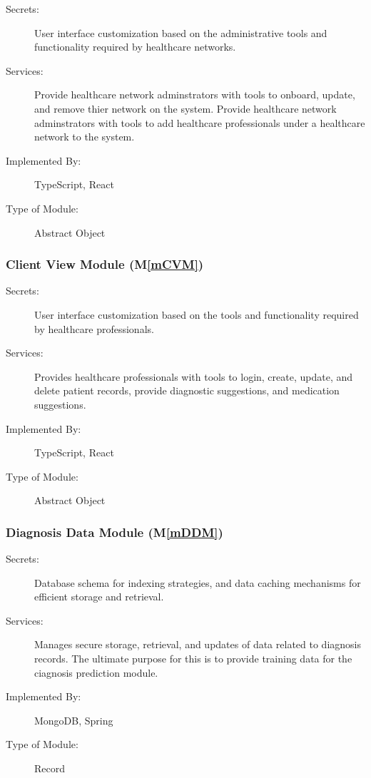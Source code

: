 \documentclass[12pt, titlepage]{article}
\newcommand{\mref}[1]{M\ref{#1}}
\begin{document}
\begin{description}
\item[Secrets:]User interface customization based on the administrative tools and functionality required by healthcare networks.
\item[Services:]Provide healthcare network adminstrators with tools to onboard, update, and remove thier network on the system. Provide healthcare network adminstrators with tools to add healthcare professionals under a healthcare network to the system.
\item[Implemented By:]TypeScript, React
\item[Type of Module:]Abstract Object
\end{description}

\subsubsection{Client View Module (\mref{mCVM})}

\begin{description}
\item[Secrets:]User interface customization based on the tools and functionality required by healthcare professionals.
\item[Services:]Provides healthcare professionals with tools to login, create, update, and delete patient records, provide diagnostic suggestions, and medication suggestions.
\item[Implemented By:]TypeScript, React
\item[Type of Module:]Abstract Object
\end{description}

\subsubsection{Diagnosis Data Module (\mref{mDDM})}

\begin{description}
  \item[Secrets:]Database schema for indexing strategies, and data caching mechanisms for efficient storage and retrieval.
  \item[Services:]Manages secure storage, retrieval, and updates of data related to diagnosis records. The ultimate purpose for this is to provide training data for the ciagnosis prediction module.
  \item[Implemented By:]MongoDB, Spring
  \item[Type of Module:]Record
\end{description}
\end{document}
